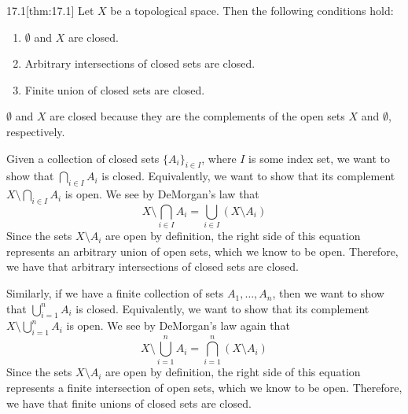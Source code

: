 \begin{thmBox}{17.1}[thm:17.1]
    Let \( X \) be a topological space. 
    Then the following conditions hold: 
    \begin{enumerate}
        \item \( \emptyset \) and \( X \) are closed.
        \item Arbitrary intersections of closed sets are closed. 
        \item Finite union of closed sets are closed. 
    \end{enumerate}

    \baseRule

    \begin{proofBox}
        \baseSkip

        \( \emptyset \) and \( X \) are closed because they are the complements 
        of the open sets \( X \) and \( \emptyset \), respectively.

        \baseSkip
        Given a collection of closed sets \( \{ A_{ i } \}_{ i \in I } \), where
        \( I \) is some index set, we want to show that 
        \( \bigcap_{ i \in I } A_{ i } \) is closed.
        Equivalently, we want to show that its complement 
        \( X \setminus \bigcap_{ i \in I } A_{ i } \) is open.
        We see by DeMorgan's law that 
        \begin{equation*}
            X \setminus \bigcap_{ i \in I } A_{ i }
            =
            \bigcup_{ i \in I } ( X \setminus A_{ i } )
        \end{equation*}
        Since the sets \( X \setminus A_{ i } \) are open by definition, the 
        right side of this equation represents an arbitrary union of open sets,
        which we know to be open. 
        Therefore, we have that arbitrary intersections of closed sets are 
        closed. 

        \baseSkip
        Similarly, if we have a finite collection of sets 
        \( A_{ 1 } , \ldots , A_{ n } \), then we want to show that 
        \( \bigcup_{ i = 1 }^{ n } A_{ i } \) is closed.
        Equivalently, we want to show that its complement 
        \( X \setminus \bigcup_{ i = 1 }^{ n } A_{ i } \) is open.
        We see by DeMorgan's law again that 
        \begin{equation*}
            X \setminus \bigcup_{ i = 1 }^{ n } A_{ i }
            =
            \bigcap_{ i = 1 }^{ n } ( X \setminus A_{ i } )
        \end{equation*}
        Since the sets \( X \setminus A_{ i } \) are open by definition, the 
        right side of this equation represents a finite intersection of open 
        sets, which we know to be open. 
        Therefore, we have that finite unions of closed sets are 
        closed. 
    \end{proofBox}
\end{thmBox}

